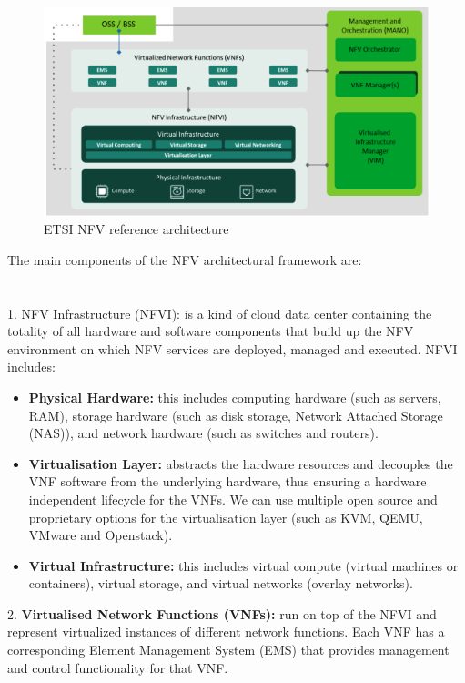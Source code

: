\begin{figure}[h]
    \centering
    \includegraphics[width=1\textwidth]{2_2_3Architecture}
    \caption{ETSI NFV reference architecture}
    \label{fig:2_2_3Architecture}
\end{figure}

The main components of the NFV architectural framework are:\\
\\
\\
1. NFV Infrastructure (NFVI): is a kind of cloud data center containing the totality of
all hardware and software components that build up the NFV environment on which
NFV services are deployed, managed and executed. NFVI includes:

\begin{itemize}
\item \textbf{Physical Hardware:} this includes computing hardware (such as servers, RAM),
storage hardware (such as disk storage, Network Attached Storage (NAS)), and
network hardware (such as switches and routers).
\item \textbf{Virtualisation Layer:} abstracts the hardware resources and decouples the VNF
software from the underlying hardware, thus ensuring a hardware independent
lifecycle for the VNFs. We can use multiple open source and proprietary options
for the virtualisation layer (such as KVM, QEMU, VMware and Openstack).
\item \textbf{Virtual Infrastructure:} this includes virtual compute (virtual machines or containers), virtual storage, and virtual networks (overlay networks).
\end{itemize}

2. \textbf{Virtualised Network Functions (VNFs):} run on top of the NFVI and represent virtualized instances of different network functions. Each VNF has a corresponding Element Management System (EMS) that provides management and control functionality for that VNF.

